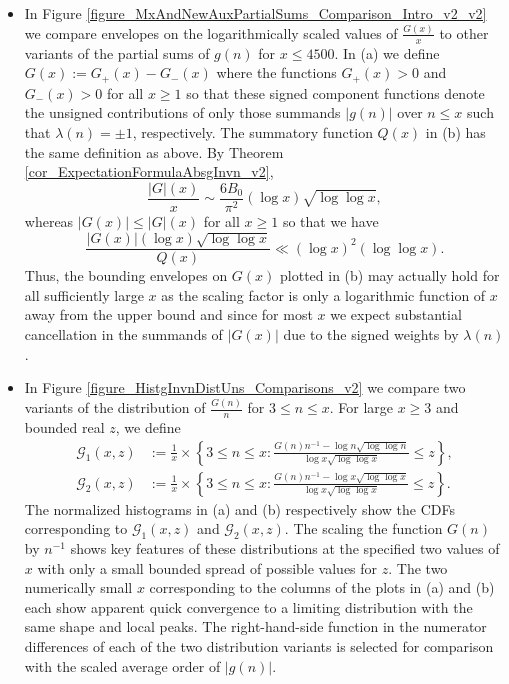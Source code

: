 \documentclass[11pt,reqno,a4letter]{article}
\newcommand{\hlocalref}[1]{\hyperref[#1]{\ref{#1}}}
\numberwithin{equation}{section}
\numberwithin{figure}{section}
\numberwithin{table}{section}
\theoremstyle{plain}
\numberwithin{theorem}{section}
\theoremstyle{definition}
\begin{document}
\begin{itemize}[noitemsep,topsep=0pt,leftmargin=0.23in]
\item In Figure \hlocalref{figure_MxAndNewAuxPartialSums_Comparison_Intro_v2_v2} we compare 
      envelopes on the logarithmically scaled values of $\frac{G(x)}{x}$ to other variants of 
      the partial sums of $g(n)$ for $x \leq 4500$. 
      In (a) we define $G(x) := G_{+}(x) - G_{-}(x)$ where the functions 
      $G_{+}(x) > 0$ and $G_{-}(x) > 0$ for all $x \geq 1$ 
      so that these signed component functions denote the unsigned contributions of only those summands 
      $|g(n)|$ over $n \leq x$ such that $\lambda(n) = \pm 1$, respectively. 
      The summatory function $Q(x)$ in (b) has the same definition as above. 
      By Theorem \hlocalref{cor_ExpectationFormulaAbsgInvn_v2}, 
      \[
      \frac{|G|(x)}{x} \sim \frac{6B_0}{\pi^2} (\log x) \sqrt{\log\log x}, 
      \]
      whereas $|G(x)| \leq |G|(x)$ for all $x \geq 1$ so that we have 
      \[
      \frac{|G(x)| (\log x) \sqrt{\log\log x}}{Q(x)} \ll (\log x)^2 (\log\log x). 
      \]
      Thus, the bounding envelopes on $G(x)$ plotted in (b) may actually hold for all sufficiently 
      large $x$ as the scaling factor is only a logarithmic function of $x$ away from the upper bound 
      and since for most $x$ 
      we expect substantial cancellation in the summands of $|G(x)|$ due to the signed weights by 
      $\lambda(n)$. 

\item In Figure \hlocalref{figure_HistgInvnDistUns_Comparisons_v2} we compare two variants of the 
      distribution of $\frac{G(n)}{n}$ for $3 \leq n \leq x$. For large $x \geq 3$ and bounded 
      real $z$, we define 
      \begin{align*}
      \mathcal{G}_1(x, z) & := \frac{1}{x} \times \left\{3 \leq n \leq x: 
           \frac{G(n)n^{-1} - \log n \sqrt{\log\log n}}{\log x \sqrt{\log\log x}} \leq z\right\}, \\ 
      \mathcal{G}_2(x, z) & := \frac{1}{x} \times \left\{3 \leq n \leq x: 
           \frac{G(n)n^{-1} - \log x \sqrt{\log\log x}}{\log x \sqrt{\log\log x}} \leq z\right\}. 
      \end{align*} 
      The normalized histograms in (a) and (b) respectively show the CDFs corresponding to $\mathcal{G}_1(x, z)$ and 
      $\mathcal{G}_2(x, z)$. The scaling the function $G(n)$ by $n^{-1}$ shows key features of these 
      distributions at the specified two values of $x$ with only a small bounded spread of possible values for $z$. 
      The two numerically small $x$ corresponding to the columns of the plots in (a) and (b) 
      each show apparent quick convergence to a limiting distribution with the same shape and local peaks. 
      The right-hand-side function in the numerator differences of each of the two distribution variants is 
      selected for comparison with the scaled average order of $|g(n)|$. 


\end{itemize}
\end{document}
